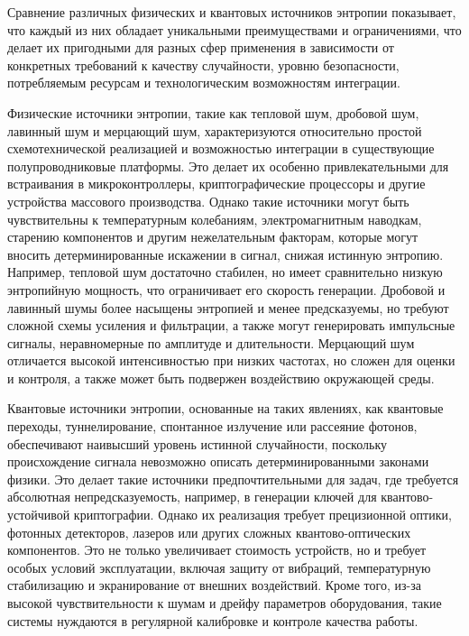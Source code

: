 \clearpage
\setcounter{figure}{8}
\setcounter{table}{1}


Сравнение различных физических и квантовых источников энтропии
показывает, что каждый из них обладает уникальными преимуществами и
ограничениями, что делает их пригодными для разных сфер применения в
зависимости от конкретных требований к качеству случайности, уровню
безопасности, потребляемым ресурсам и технологическим возможностям
интеграции.

Физические источники энтропии, такие как тепловой шум, дробовой шум,
лавинный шум и мерцающий шум, характеризуются относительно простой
схемотехнической реализацией и возможностью интеграции в существующие
полупроводниковые платформы. Это делает их особенно привлекательными для
встраивания в микроконтроллеры, криптографические процессоры и другие
устройства массового производства. Однако такие источники могут быть
чувствительны к температурным колебаниям, электромагнитным наводкам,
старению компонентов и другим нежелательным факторам, которые могут
вносить детерминированные искажении в сигнал, снижая истинную энтропию.
Например, тепловой шум достаточно стабилен, но имеет сравнительно низкую
энтропийную мощность, что ограничивает его скорость генерации. Дробовой
и лавинный шумы более насыщены энтропией и менее предсказуемы, но
требуют сложной схемы усиления и фильтрации, а также могут генерировать
импульсные сигналы, неравномерные по амплитуде и длительности. Мерцающий
шум отличается высокой интенсивностью при низких частотах, но сложен для
оценки и контроля, а также может быть подвержен воздействию окружающей
среды.

Квантовые источники энтропии, основанные на таких явлениях, как
квантовые переходы, туннелирование, спонтанное излучение или рассеяние
фотонов, обеспечивают наивысший уровень истинной случайности, поскольку
происхождение сигнала невозможно описать детерминированными законами
физики. Это делает такие источники предпочтительными для задач, где
требуется абсолютная непредсказуемость, например, в генерации ключей для
квантово-устойчивой криптографии. Однако их реализация требует
прецизионной оптики, фотонных детекторов, лазеров или других сложных
квантово-оптических компонентов. Это не только увеличивает стоимость
устройств, но и требует особых условий эксплуатации, включая защиту от
вибраций, температурную стабилизацию и экранирование от внешних
воздействий. Кроме того, из-за высокой чувствительности к шумам и дрейфу
параметров оборудования, такие системы нуждаются в регулярной калибровке
и контроле качества работы.

